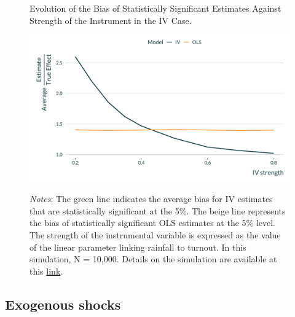 \documentclass[usletter, 12pt]{article}
\begin{document}
                    		 \begin{figure}[!h] 
                    			\begin{center}
                    				\caption{Evolution of the Bias of Statistically Significant Estimates Against Strength of the Instrument in the IV Case.}
                    				\label{graph_IV}
                    				\includegraphics[width=0.8\linewidth]{images/main_graph_IV_paper.pdf}
                                    \caption*{\footnotesize \textit{Notes}: The green line indicates the average bias for IV estimates that are statistically significant at the 5\%. The beige line represents the bias of statistically significant OLS estimates at the 5\% level. The strength of the instrumental variable is expressed as the value of the linear parameter linking rainfall to turnout. In this simulation, N = 10,000. Details on the simulation are available at this \href{https://vincentbagilet.github.io/causal_inflation/IV.html}{link}.}
                                    \end{center}
				\vspace{-1cm}
                    		\end{figure} 
		




		\subsection{Exogenous shocks}\label{sim_shocks}
    
\end{document}
